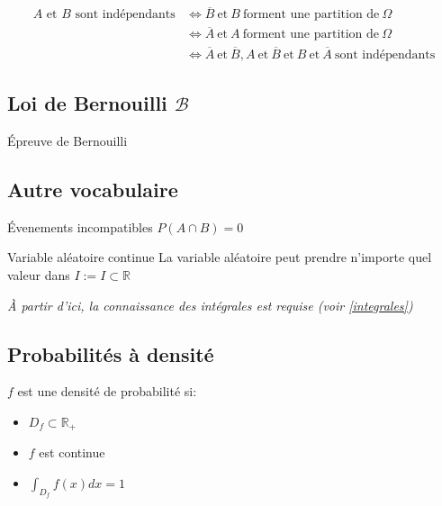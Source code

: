 \documentclass{article}
\newcommand{\R}{\mathds{R}}
\newcommand{\et}{\:\text{et}\:}
\newenvironment{descriptiona}{\begin{description}[leftmargin=!,labelwidth=\widthof{\bfseries The longest label}]}{\end{description}}
\begin{document}
\begin{equation*}
    \begin{split}
        A\text{ et }B\text{ sont indépendants} &\iff \overline{B} \et B  \:\text{forment une partition de}\: \Omega\\
                                               &\iff \overline{A} \et A  \:\text{forment une partition de}\: \Omega\\
                                               &\iff \overline{A} \et \overline{B}, A \et \overline{B} \et B \et \overline{A} \:\text{sont indépendants}
    \end{split}
\end{equation*}

\subsection{Loi de Bernouilli $\mathcal{B}$}

\begin{descriptiona}
\item[Épreuve de Bernouilli]
\end{descriptiona}

\subsection{Autre vocabulaire}
\begin{descriptiona}
\item[Évenements incompatibles]
$P(A \cap B) = 0$ 
\item[Variable aléatoire continue] La variable aléatoire peut prendre n'importe quel valeur dans $I := I \subset \R$
\end{descriptiona}

\textit{À partir d'ici, la connaissance des intégrales est requise (voir \ref{integrales})}
\subsection{Probabilités à densité}

$f$ est une densité de probabilité si:

\begin{itemize}
    \item $D_f \subset \R_+$
    \item $f$ est continue
    \item ${\displaystyle \int_{D_f} f(x)dx = 1}$
\end{itemize}
\end{document}
